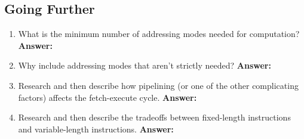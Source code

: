 \documentclass[12pt]{article}
\begin{document}
\subsection*{Going Further}
\begin{enumerate}
    \item What is the minimum number of addressing modes needed for computation?
        \textbf{Answer:}
    \item Why include addressing modes that aren't strictly needed?
        \textbf{Answer:}
    \item Research and then describe how pipelining (or one of the other complicating factors) affects the fetch-execute cycle.
        \textbf{Answer:}
    \item Research and then describe the tradeoffs between fixed-length instructions and variable-length instructions.
        \textbf{Answer:}
\end{enumerate}
\end{document}
